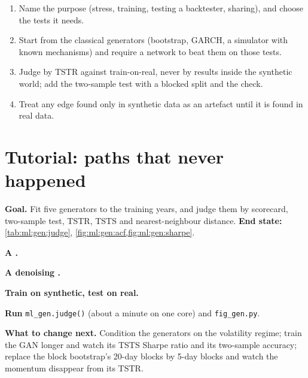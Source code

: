 \begin{method}\label{met:ml:gen:method}
\begin{enumerate}
\item Name the purpose (stress, training, testing a backtester, sharing), and choose the tests it needs.
\item Start from the classical generators (bootstrap, GARCH, a simulator with known mechanisms) and require a network to
beat them on those tests.
\item Judge by TSTR against train-on-real, never by results inside the synthetic world; add the two-sample test with a
blocked split and the  check.
\item Treat any edge found only in synthetic data as an artefact until it is found in real data.
\end{enumerate}
\end{method}

\section{Tutorial: paths that never happened}\label{tut:ml:generative-models-and-synthetic-data:tut}

\begin{tutorial}
\textbf{Goal.} Fit five generators to the training years, and judge them by scorecard, two-sample test, TSTR, TSTS and
nearest-neighbour distance. \textbf{End state:} \cref{tab:ml:gen:judge}, \cref{fig:ml:gen:acf,fig:ml:gen:sharpe}.
\begin{tutsteps}
\item \textbf{A .}
\label{lst:ml:gen:gan}
\item \textbf{A denoising .}
\label{lst:ml:gen:diffusion}
\item \textbf{Train on synthetic, test on real.}
\label{lst:ml:gen:tests}
\item \textbf{Run} \texttt{ml\_gen.judge()} (about a minute on one core) and \texttt{fig\_gen.py}.
\end{tutsteps}
\textbf{What to change next.} Condition the generators on the volatility regime; train the GAN longer and watch its TSTS
Sharpe ratio and its two-sample accuracy; replace the block bootstrap's 20-day blocks by 5-day blocks and watch the
momentum disappear from its TSTR.
\end{tutorial}

